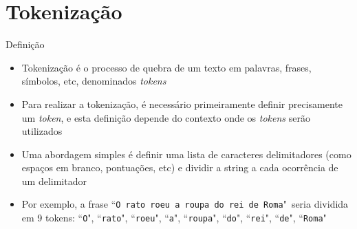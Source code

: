 \section{Tokenização}

\begin{frame}[fragile]{Definição}

    \begin{itemize}
        \item Tokenização é o processo de quebra de um texto em palavras, frases, símbolos, etc, 
            denominados \textit{tokens}

        \item Para realizar a tokenização, é necessário primeiramente definir precisamente um 
            \textit{token}, e esta definição depende do contexto onde os \textit{tokens} serão 
            utilizados

        \item Uma abordagem simples é definir uma lista de caracteres delimitadores (como espaços 
            em branco, pontuações, etc) e dividir a string a cada ocorrência de um delimitador

        \item Por exemplo, a frase ``\texttt{O rato roeu a roupa do rei de Roma}"\ seria dividida 
            em 9 tokens: ``\texttt{O}", ``\texttt{rato}", ``\texttt{roeu}", ``\texttt{a}", 
            ``\texttt{roupa}", ``\texttt{do}", ``\texttt{rei}", ``\texttt{de}", ``\texttt{Roma}"
    \end{itemize}

\end{frame}

